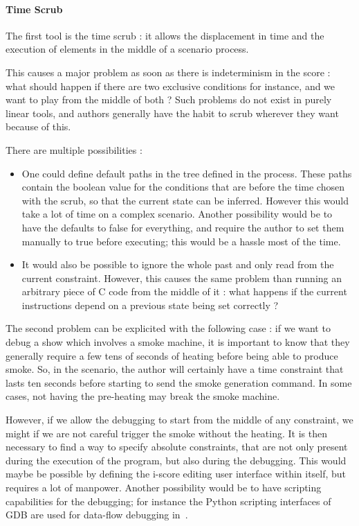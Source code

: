 \documentclass{sigchi}
\begin{document}
\paragraph{Time Scrub}
The first tool is the time scrub : it allows the displacement in time and the execution of elements in the middle of a scenario process. 

This causes a major problem as soon as there is indeterminism in the score : what should happen if there are two exclusive conditions for instance, and we want to play from the middle of both ? Such problems do not exist in purely linear tools, and authors generally have the habit to scrub wherever they want because of this.

There are multiple possibilities : 

\begin{itemize}
    \item One could define default paths in the tree defined in the process. These paths contain the boolean value for the conditions that are before the time chosen with the scrub, so that the current state can be inferred. However this would take a lot of time on a complex scenario.
    Another possibility would be to have the defaults to false for everything, and require the author to set them manually to true before executing; this would be a hassle most of the time.
    \item It would also be possible to ignore the whole past and only read from the current constraint. However, this causes the same problem than running an arbitrary piece of C code from the middle of it : what happens if the current instructions depend on a previous state being set correctly ?
\end{itemize}

The second problem can be explicited with the following case : if we want to debug a show which involves a smoke machine, it is important to know that they generally require a few tens of seconds of heating before being able to produce smoke. So, in the scenario, the author will certainly have a time constraint that lasts ten seconds before starting to send the smoke generation command. In some cases, not having the pre-heating may break the smoke machine.

However, if we allow the debugging to start from the middle of any constraint, we might if we are not careful trigger the smoke without the heating. It is then necessary to find a way to specify absolute constraints, that are not only present during the execution of the program, but also during the debugging. This would maybe be possible by defining the i-score editing user interface within itself, but requires a lot of manpower. Another possibility would be to have scripting capabilities for the debugging; for instance the Python scripting interfaces of GDB are used for data-flow debugging in~\cite{pouget2013interactive}.
\end{document}
